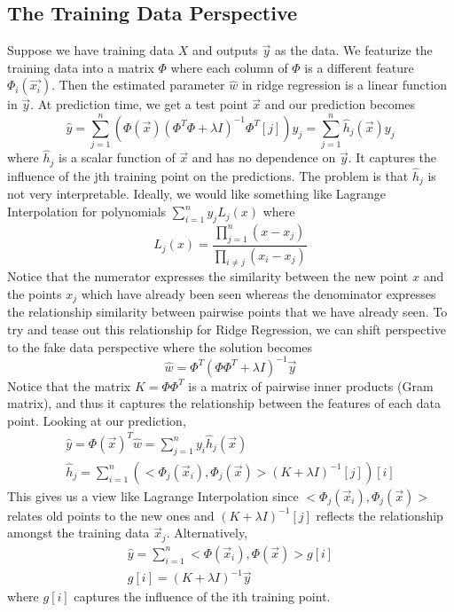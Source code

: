 \subsection{The Training Data Perspective}
Suppose we have training data $X$ and outputs $\vec{y}$ as the data. We featurize the training data into a matrix $\Phi$ where each column of $\Phi$ is a different feature $\Phi_i(\vec{x_i})$. Then the estimated parameter $\hat{w}$ in ridge regression is a linear function in $\vec{y}$. At prediction time, we get a test point $\vec{x}$ and our prediction becomes
\[
  \hat{y} = \sum_{j=1}^n\left( \Phi(\vec{x})(\Phi^T\Phi+\lambda I)^{-1}\Phi^T[j] \right)y_j = \sum_{j=1}^{n}\hat{h}_j(\vec{x})y_j
\]
where $\hat{h}_j$ is a scalar function of $\vec{x}$ and has no dependence on $\vec{y}$. It captures the influence of the jth training point on the predictions. The problem is that $\hat{h}_j$ is not very interpretable. Ideally, we would like something like Lagrange Interpolation for polynomials $\sum_{i=1}^ny_jL_j(x)$ where
\[
  L_j(x) = \frac{\prod_{j=1}^{n}(x-x_j)}{\prod_{i\ne j}(x_i - x_j)}
\]
Notice that the numerator expresses the similarity between the new point $x$ and the points $x_j$ which have already been seen whereas the denominator expresses the relationship similarity between pairwise points that we have already seen.
To try and tease out this relationship for Ridge Regression, we can shift perspective to the fake data perspective where the solution becomes
$$\hat{w} = \Phi^T(\Phi\Phi^T+\lambda I)^{-1}\vec{y}$$
Notice that the matrix $K = \Phi\Phi^T$ is a matrix of pairwise inner products (Gram matrix), and thus it captures the relationship between the features of each data point.
Looking at our prediction,
\begin{align*}
  \hat{y} = \Phi(\vec{x})^T\hat{w} = \sum_{j=1}^ny_i\hat{h}_j(\vec{x})\\
  \hat{h}_j = \sum_{i=1}^{n}\left( <\Phi_j(\vec{x}_i), \Phi_j(\vec{x})>(K+\lambda I)^{-1}[j] \right)[i]
\end{align*}
This gives us a view like Lagrange Interpolation since $<\Phi_j(\vec{x}_i), \Phi_j(\vec{x})>$ relates old points to the new ones and $(K+\lambda I)^{-1}[j]$ reflects the relationship amongst the training data $\vec{x}_j$. Alternatively,
\begin{align*}
  \hat{y} = \sum_{i=1}^{n}<\Phi(\vec{x}_i), \Phi(\vec{x})>g[i]\\
  g[i] = (K+\lambda I)^{-1}\vec{y}
\end{align*}
where $g[i]$ captures the influence of the ith training point.
